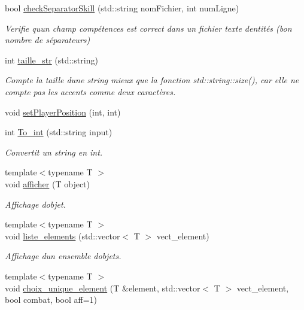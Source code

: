\begin{DoxyCompactItemize}
bool \hyperlink{namespaceio_ae543bba7ec112a88734317ca61bbb88a}{check\+Separator\+Skill} (std\+::string nom\+Fichier, int num\+Ligne)
\begin{DoxyCompactList}\small\item\em Verifie qu\textquotesingle{}un champ compétences est correct dans un fichier texte d\textquotesingle{}entités (bon nombre de séparateurs) \end{DoxyCompactList}\item 
int \hyperlink{namespaceio_a0161a5c00ad8e7222f3a052e7c9fa67b}{taille\+\_\+str} (std\+::string)
\begin{DoxyCompactList}\small\item\em Compte la taille d\textquotesingle{}une string mieux que la fonction std\+::string\+::size(), car elle ne compte pas les accents comme deux caractères. \end{DoxyCompactList}\item 
void \hyperlink{namespaceio_ac1340cd13ac838a1d1cfaa0d25a4bbfb}{set\+Player\+Position} (int, int)
\item 
int \hyperlink{namespaceio_a495fffe3be2fea58511cedcfcea5dbbd}{To\+\_\+int} (std\+::string input)
\begin{DoxyCompactList}\small\item\em Convertit un string en int. \end{DoxyCompactList}\item 
{\footnotesize template$<$typename T $>$ }\\void \hyperlink{namespaceio_ac5222293c3d12f7982a8df7ead04ba0b}{afficher} (T object)
\begin{DoxyCompactList}\small\item\em Affichage d\textquotesingle{}objet. \end{DoxyCompactList}\item 
{\footnotesize template$<$typename T $>$ }\\void \hyperlink{namespaceio_acf5693654c155fd094993bf20ac39343}{liste\+\_\+elements} (std\+::vector$<$ T $>$ vect\+\_\+element)
\begin{DoxyCompactList}\small\item\em Affichage d\textquotesingle{}un ensemble d\textquotesingle{}objets. \end{DoxyCompactList}\item 
{\footnotesize template$<$typename T $>$ }\\void \hyperlink{namespaceio_ad045ca63d3481c2da3253a3944df18e4}{choix\+\_\+unique\+\_\+element} (T \&element, std\+::vector$<$ T $>$ vect\+\_\+element, bool combat, bool aff=1)

\end{DoxyCompactItemize}
